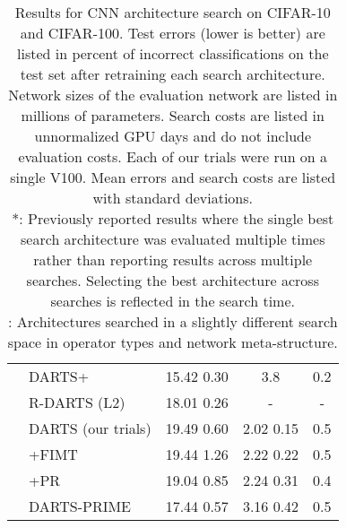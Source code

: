 \documentclass[letterpaper]{article} \usepackage{aaai22}  \usepackage{times}  \usepackage{helvet}  \usepackage{courier}  \usepackage[hyphens]{url}  \usepackage{graphicx} \urlstyle{rm} \def\UrlFont{\rm}  \usepackage{natbib}  \usepackage{caption} \DeclareCaptionStyle{ruled}{labelfont=normalfont,labelsep=colon,strut=off} \frenchspacing  \setlength{\pdfpagewidth}{8.5in}  \setlength{\pdfpageheight}{11in}  \usepackage{algorithm}
\begin{document}
\begin{table*}[t]
\begin{tabular}{@{}clccc@{}}
& DARTS+ \cite{liang2019darts+} & 15.42  0.30  & 3.8  & 0.2\\
& R-DARTS (L2) \cite{zela2020understanding} & 18.01  0.26 & - & -\\
 \cmidrule{2-5}
& DARTS (our trials) & 19.49  0.60 & 2.02  0.15 & 0.5 \\
& +FIMT & 19.44  1.26 & 2.22  0.22 & 0.5 \\
& +PR & 19.04  0.85 & 2.24  0.31 & 0.4 \\
& DARTS-PRIME & 17.44  0.57 & 3.16  0.42 & 0.5 \\
\bottomrule
\end{tabular}
\caption{Results for CNN architecture search on CIFAR-10 and CIFAR-100. Test errors (lower is better) are listed in percent of incorrect classifications on the test set after retraining each search architecture. Network sizes of the evaluation network are listed in millions of parameters. Search costs are listed in unnormalized GPU days and do not include evaluation costs. Each of our trials were run on a single V100. Mean errors and search costs are listed with standard deviations. \\ 
*: Previously reported results where the single best search architecture was evaluated multiple times rather than reporting results across multiple searches. Selecting the best architecture across searches is reflected in the search time. \\
: Architectures searched in a slightly different search space in operator types and network meta-structure.
}
\label{table:res}
\end{table*}
\end{document}
